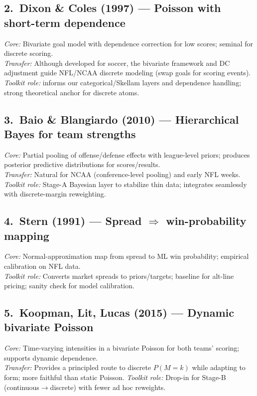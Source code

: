 \documentclass[11pt]{amsart}
\begin{document}
\subsection*{2.\ Dixon \& Coles (1997) \cite{DixonColes1997} --- Poisson with short-term dependence}
\emph{Core:} Bivariate goal model with dependence correction for low scores; seminal for discrete scoring. \\
\emph{Transfer:} Although developed for soccer, the bivariate framework and DC adjustment guide NFL/NCAA discrete modeling (swap goals for scoring events). \emph{Toolkit role:} informs our categorical/Skellam layers and dependence handling; strong theoretical anchor for discrete atoms.

\subsection*{3.\ Baio \& Blangiardo (2010) \cite{BaioBlangiardo2010} --- Hierarchical Bayes for team strengths}
\emph{Core:} Partial pooling of offense/defense effects with league-level priors; produces posterior predictive distributions for scores/results. \\
\emph{Transfer:} Natural for NCAA (conference-level pooling) and early NFL weeks. \emph{Toolkit role:} Stage-A Bayesian layer to stabilize thin data; integrates seamlessly with discrete-margin reweighting.

\subsection*{4.\ Stern (1991) \cite{Stern1991} --- Spread $\Rightarrow$ win-probability mapping}
\emph{Core:} Normal-approximation map from spread to ML win probability; empirical calibration on NFL data. \\
\emph{Toolkit role:} Converts market spreads to priors/targets; baseline for alt-line pricing; sanity check for model calibration.

\subsection*{5.\ Koopman, Lit, Lucas (2015) \cite{Koopman2015} --- Dynamic bivariate Poisson}
\emph{Core:} Time-varying intensities in a bivariate Poisson for both teams’ scoring; supports dynamic dependence. \\
\emph{Transfer:} Provides a principled route to discrete $P(M=k)$ while adapting to form; more faithful than static Poisson. \emph{Toolkit role:} Drop-in for Stage-B (continuous$\to$discrete) with fewer ad hoc reweights.
\end{document}
